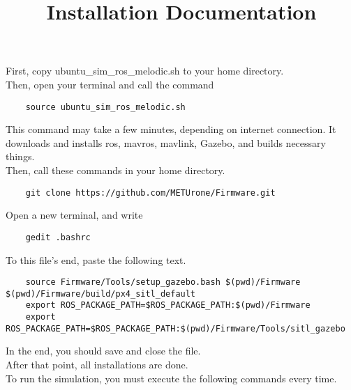 \documentclass{article}
\title{Installation Documentation}
\begin{document}
\maketitle

\section*{}
\subsection*{}
First, copy ubuntu\_sim\_ros\_melodic.sh to your home directory. \\
Then, open your terminal and call the command \\
\begin{verbatim}
    source ubuntu_sim_ros_melodic.sh
\end{verbatim}
\noindent
This command may take a few minutes, depending on internet connection. It downloads and installs ros, mavros, mavlink, Gazebo, and builds necessary things. \\
\noindent
Then, call these commands in your home directory. \\
\begin{verbatim}
    git clone https://github.com/METUrone/Firmware.git
\end{verbatim}
\noindent
Open a new terminal, and write \\
\begin{verbatim}
    gedit .bashrc
\end{verbatim}
\noindent
To this file's end, paste the following text. \\
\begin{verbatim}
    source Firmware/Tools/setup_gazebo.bash $(pwd)/Firmware $(pwd)/Firmware/build/px4_sitl_default
    export ROS_PACKAGE_PATH=$ROS_PACKAGE_PATH:$(pwd)/Firmware
    export ROS_PACKAGE_PATH=$ROS_PACKAGE_PATH:$(pwd)/Firmware/Tools/sitl_gazebo
\end{verbatim}
\noindent
In the end, you should save and close the file. \\
After that point, all installations are done. \\

To run the simulation, you must execute the following commands every time. \\
\end{document}
